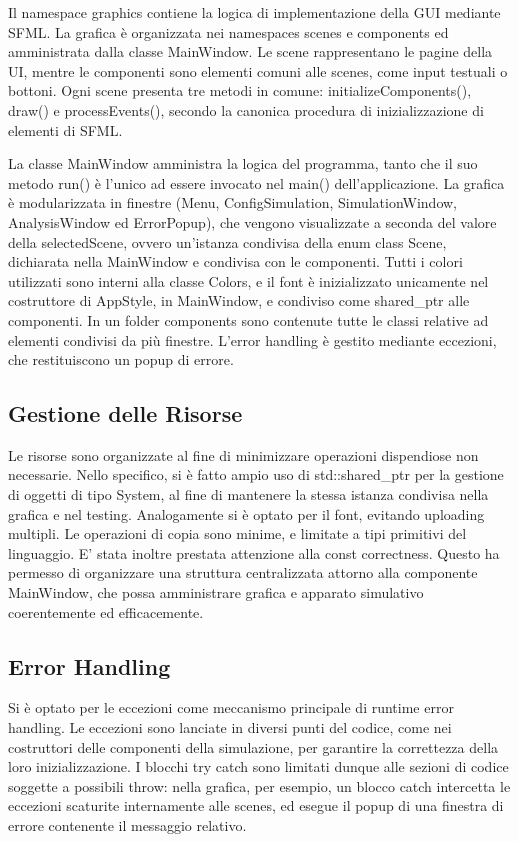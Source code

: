 \documentclass{article}
\begin{document}
Il namespace graphics contiene la logica di implementazione della GUI mediante SFML.
La grafica è organizzata nei namespaces scenes e components ed amministrata dalla classe MainWindow.
Le scene rappresentano le pagine della UI, mentre le componenti sono elementi comuni alle scenes, come input testuali o bottoni.
Ogni scene presenta tre metodi in comune: initializeComponents(), draw() e processEvents(), secondo la canonica procedura di inizializzazione di elementi di SFML.


La classe MainWindow amministra la logica del programma, tanto che il suo metodo run() è l'unico ad essere invocato nel main() dell'applicazione.
La grafica è modularizzata in finestre (Menu, ConfigSimulation, SimulationWindow, AnalysisWindow ed ErrorPopup), che vengono visualizzate a seconda del valore della selectedScene, ovvero un'istanza condivisa della enum class Scene, dichiarata nella MainWindow e condivisa con le componenti.
Tutti i colori utilizzati sono interni alla classe Colors, e il font è inizializzato unicamente nel costruttore di AppStyle, in MainWindow, e condiviso come shared\_ptr alle componenti.
In un folder components sono contenute tutte le classi relative ad elementi condivisi da più finestre.
L'error handling è gestito mediante eccezioni, che restituiscono un popup di errore.


\subsection{Gestione delle Risorse}
Le risorse sono organizzate al fine di minimizzare operazioni dispendiose non necessarie.
Nello specifico, si è fatto ampio uso di std::shared\_ptr per la gestione di oggetti di tipo System, al fine di mantenere la stessa istanza condivisa nella grafica e nel testing.
Analogamente si è optato per il font, evitando uploading multipli.
Le operazioni di copia sono minime, e limitate a tipi primitivi del linguaggio.
E' stata inoltre prestata attenzione alla const correctness.
Questo ha permesso di organizzare una struttura centralizzata attorno alla componente MainWindow, che possa amministrare grafica e apparato simulativo coerentemente ed efficacemente.

\subsection{Error Handling}
Si è optato per le eccezioni come meccanismo principale di runtime error handling. Le eccezioni sono lanciate in diversi punti del codice, come nei costruttori delle componenti della simulazione, per garantire la correttezza della loro inizializzazione.
I blocchi try catch sono limitati dunque alle sezioni di codice soggette a possibili throw: nella grafica, per esempio, un blocco catch intercetta le eccezioni scaturite internamente alle scenes, ed esegue il popup di una finestra di errore contenente il messaggio relativo.
\end{document}

